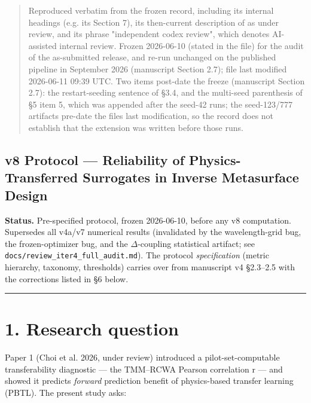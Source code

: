 \documentclass[11pt,a4paper]{article}
\begin{document}
\begin{quote}
Reproduced verbatim from the frozen record, including its internal headings (e.g. its Section 7), its then-current description of \cite{choi20261} as under review, and its phrase "independent codex review", which denotes AI-assisted internal review. Frozen 2026-06-10 (stated in the file) for the audit of the as-submitted release, and re-run unchanged on the published pipeline in September 2026 (manuscript Section 2.7); file last modified 2026-06-11 09:39 UTC. Two items post-date the freeze (manuscript Section 2.7): the restart-seeding sentence of \S{}3.4, and the multi-seed parenthesis of \S{}5 item 5, which was appended after the seed-42 runs; the seed-123/777 artifacts pre-date the file\textquotesingle s last modification, so the record does not establish that the extension was written before those runs.
\end{quote}

\begingroup\small

\subsection*{v8 Protocol --- Reliability of Physics-Transferred Surrogates in Inverse Metasurface Design}

\textbf{Status.} Pre-specified protocol, frozen 2026-06-10, before any v8 computation.
Supersedes all v4a/v7 numerical results (invalidated by the wavelength-grid bug,
the frozen-optimizer bug, and the \ensuremath{\Delta}-coupling statistical artifact; see
\texttt{docs/\allowbreak{}review\_\allowbreak{}iter4\_\allowbreak{}full\_\allowbreak{}audit.\allowbreak{}md}). The protocol \emph{specification} (metric
hierarchy, taxonomy, thresholds) carries over from manuscript v4 \S{}2.3--2.5 with
the corrections listed in \S{}6 below.

\begin{center}\rule{0.5\linewidth}{0.5pt}\end{center}

\section*{1. Research question}

Paper 1 (Choi et al. 2026, under review) introduced a pilot-set-computable
transferability diagnostic --- the TMM--RCWA Pearson correlation r --- and showed
it predicts \emph{forward} prediction benefit of physics-based transfer learning
(PBTL). The present study asks:
\end{document}
